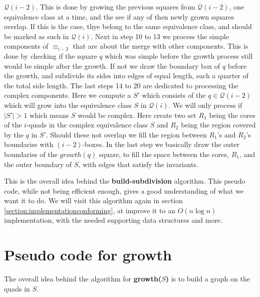 $\mathcal{Q}(i-2)$. This is done by growing the previous squares from $\mathcal{Q}(i-2)$, one 
equivalence class at a time, and the see if any of then newly grown squares overlap. If this is 
the case, thye belong to the same equivalence class, and should be marked as such in 
$\mathcal{Q}(i)$. Next in step 10 to 13 we process the simple components of $\equiv_{i-2}$ that 
are about the merge with other components. This is done by checking if the square $q$ which was 
simple before the growth process still would be simple after the growth. If not we draw the 
boundary box of $q$ before the growth, and subdivide its sides into edges of equal length, each 
a quarter of the total side length. The last steps 14 to 20 are dedicated to processing the 
complex components. Here we compute a $S'$ which consists of the $q \in \mathcal{Q}(i-2)$ which 
will grow into the equivalence class $S$ in $\mathcal{Q}(i)$. We will only process if $|S'| > 1$ 
which means $S$ would be complex. Here create two set $R_1$ being the cores of the $i$-quads in 
the complex equivalence class $S$ and $R_2$ being the region covered by the $q$ in $S'$. Should 
these not overlap we fill the region between $R_1$'s and $R_2$'s boundaries with $(i-2)$-boxes. 
In the last step we basically draw the outer boundaries of the $growth(q)$ square, to fill the 
space between the cores, $R_1$, and the outer boundary of $S$, with edges that satisfy the 
invariants. 

This is the overall idea behind the \textbf{build-subdivision} algorithm. This pseudo code, 
while not being efficient enough, gives a good understanding of what we want it to do. We will 
visit this algorithm again in section \ref{section:implementationconforming}, at improve it to 
an $O(n \log n)$ implementation, with the needed supporting data structures and more.

\section{Pseudo code for \textbf{growth}}

The overall idea behind the algorithm for \textbf{growth($S$)} is to build a graph on the quads 
in $S$. 

